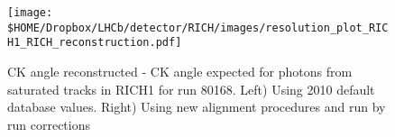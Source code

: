 




\begin{figure}[h]
	\begin{center}
		\texttt{[image: \$HOME/Dropbox/LHCb/detector/RICH/images/resolution\_plot\_RICH1\_RICH\_reconstruction.pdf]}
		\caption{CK angle reconstructed - CK angle expected for photons from saturated tracks in RICH1 for run 80168. Left) Using 2010 default database values. Right) Using new alignment procedures and run by run corrections}
		\label{fig: resolution_plot_RICH1_RICH_reconstruction}
	\end{center}
\end{figure}

